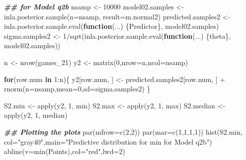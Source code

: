 \documentclass[
]{article}
\newenvironment{Shaded}{\begin{snugshade}}{\end{snugshade}}
\newcommand{\AttributeTok}[1]{\textcolor[rgb]{0.77,0.63,0.00}{#1}}
\newcommand{\ControlFlowTok}[1]{\textcolor[rgb]{0.13,0.29,0.53}{\textbf{#1}}}
\newcommand{\DecValTok}[1]{\textcolor[rgb]{0.00,0.00,0.81}{#1}}
\newcommand{\DocumentationTok}[1]{\textcolor[rgb]{0.56,0.35,0.01}{\textbf{\textit{#1}}}}
\newcommand{\FunctionTok}[1]{\textcolor[rgb]{0.00,0.00,0.00}{#1}}
\newcommand{\NormalTok}[1]{#1}
\newcommand{\OtherTok}[1]{\textcolor[rgb]{0.56,0.35,0.01}{#1}}
\newcommand{\SpecialCharTok}[1]{\textcolor[rgb]{0.00,0.00,0.00}{#1}}
\newcommand{\StringTok}[1]{\textcolor[rgb]{0.31,0.60,0.02}{#1}}
\begin{document}
\begin{Shaded}
\begin{Highlighting}[]
\DocumentationTok{\#\# for Model q2b }
\NormalTok{nsamp }\OtherTok{\textless{}{-}} \DecValTok{10000}
\NormalTok{model02.samples }\OtherTok{\textless{}{-}} \FunctionTok{inla.posterior.sample}\NormalTok{(}\AttributeTok{n=}\NormalTok{nsamp, }\AttributeTok{result=}\NormalTok{m.normal2)}
\NormalTok{predicted.samples2 }\OtherTok{\textless{}{-}} \FunctionTok{inla.posterior.sample.eval}\NormalTok{(}\ControlFlowTok{function}\NormalTok{(...) \{Predictor\}, model02.samples)}
\NormalTok{sigma.samples2 }\OtherTok{\textless{}{-}} \DecValTok{1}\SpecialCharTok{/}\FunctionTok{sqrt}\NormalTok{(}\FunctionTok{inla.posterior.sample.eval}\NormalTok{(}\ControlFlowTok{function}\NormalTok{(...) \{theta\}, model02.samples))}

\NormalTok{n }\OtherTok{\textless{}{-}} \FunctionTok{nrow}\NormalTok{(games\_21)}
\NormalTok{y2 }\OtherTok{\textless{}{-}} \FunctionTok{matrix}\NormalTok{(}\DecValTok{0}\NormalTok{,}\AttributeTok{nrow=}\NormalTok{n,}\AttributeTok{ncol=}\NormalTok{nsamp)}

\ControlFlowTok{for}\NormalTok{(row.num }\ControlFlowTok{in} \DecValTok{1}\SpecialCharTok{:}\NormalTok{n)\{ }
\NormalTok{   y2[row.num, ] }\OtherTok{\textless{}{-}}\NormalTok{ predicted.samples2[row.num, ] }\SpecialCharTok{+} \FunctionTok{rnorm}\NormalTok{(}\AttributeTok{n=}\NormalTok{nsamp,}\AttributeTok{mean=}\DecValTok{0}\NormalTok{,}\AttributeTok{sd=}\NormalTok{sigma.samples2)}
\NormalTok{\}}

\NormalTok{S2.min }\OtherTok{\textless{}{-}} \FunctionTok{apply}\NormalTok{(y2, }\DecValTok{1}\NormalTok{, min)}
\NormalTok{S2.max }\OtherTok{\textless{}{-}} \FunctionTok{apply}\NormalTok{(y2, }\DecValTok{1}\NormalTok{, max)}
\NormalTok{S2.median }\OtherTok{\textless{}{-}} \FunctionTok{apply}\NormalTok{(y2, }\DecValTok{1}\NormalTok{, median)}

\DocumentationTok{\#\# Plotting the plots}
\FunctionTok{par}\NormalTok{(}\AttributeTok{mfrow=}\FunctionTok{c}\NormalTok{(}\DecValTok{2}\NormalTok{,}\DecValTok{2}\NormalTok{))}
\FunctionTok{par}\NormalTok{(}\AttributeTok{mar=}\FunctionTok{c}\NormalTok{(}\DecValTok{1}\NormalTok{,}\DecValTok{1}\NormalTok{,}\DecValTok{1}\NormalTok{,}\DecValTok{1}\NormalTok{))}
\FunctionTok{hist}\NormalTok{(S2.min, }\AttributeTok{col=}\StringTok{"gray40"}\NormalTok{,}\AttributeTok{main=}\StringTok{"Predictive distribution for min for Model q2b"}\NormalTok{)}
\FunctionTok{abline}\NormalTok{(}\AttributeTok{v=}\FunctionTok{min}\NormalTok{(Points),}\AttributeTok{col=}\StringTok{"red"}\NormalTok{,}\AttributeTok{lwd=}\DecValTok{2}\NormalTok{)}


\end{Highlighting}
\end{Shaded}
\end{document}
